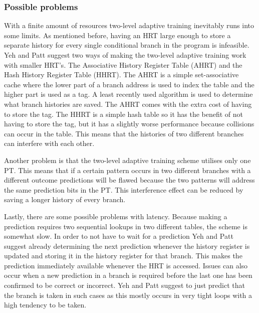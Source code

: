 \subsubsection{Possible problems}
With a finite amount of resources two-level adaptive training inevitably runs into some limits. As mentioned before, having an HRT large enough to store a separate history for every single conditional branch in the program is infeasible. Yeh and Patt suggest two ways of making the two-level adaptive training work with smaller HRT's. The Associative History Register Table (AHRT) and the Hash History Register Table (HHRT). The AHRT is a simple set-associative cache where the lower part of a branch address is used to index the table and the higher part is used as a tag. A least recently used algorithm is used to determine what branch histories are saved. The AHRT comes with the extra cost of having to store the tag. The HHRT is a simple hash table so it has the benefit of not having to store the tag, but it has a slightly worse performance because collisions can occur in the table. This means that the histories of two different branches can interfere with each other.

Another problem is that the two-level adaptive training scheme utilises only one PT. This means that if a certain pattern occurs in two different branches with a different outcome predictions will be flawed because the two patterns will address the same prediction bits in the PT. This interference effect can be reduced by saving a longer history of every branch.

Lastly, there are some possible problems with latency. Because making a prediction requires two sequential lookups in two different tables, the scheme is somewhat slow. In order to not have to wait for a prediction Yeh and Patt suggest already determining the next prediction whenever the history register is updated and storing it in the history register for that branch. This makes the prediction immediately available whenever the HRT is accessed. Issues can also occur when a new prediction in a branch is required before the last one has been confirmed to be correct or incorrect. Yeh and Patt suggest to just predict that the branch is taken in such cases as this mostly occurs in very tight loops with a high tendency to be taken.